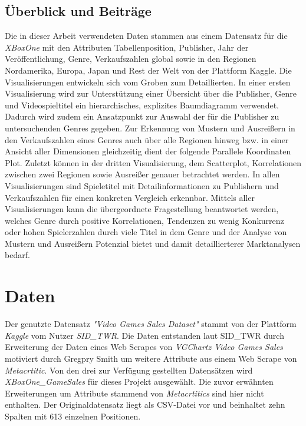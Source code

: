 \documentclass[usegeometry=true]{scrartcl}
\begin{document}
\subsection{Überblick und Beiträge}
Die in dieser Arbeit verwendeten Daten stammen aus einem Datensatz für die \textit{XBoxOne} mit den Attributen Tabellenposition, Publisher, Jahr der Veröffentlichung, Genre, Verkaufszahlen global sowie in den Regionen Nordamerika, Europa, Japan und Rest der Welt von der Plattform Kaggle.\cite{SID_TWR.} 
Die Visualisierungen entwickeln sich vom Groben zum Detaillierten.
In einer ersten Visualisierung wird zur Unterstützung einer Übersicht über die Publisher, Genre und Videospieltitel ein hierarchisches, explizites Baumdiagramm verwendet. 
Dadurch wird zudem ein Ansatzpunkt zur Auswahl der für die Publisher zu untersuchenden Genres gegeben.
Zur Erkennung von Mustern und Ausreißern in den Verkaufszahlen eines Genres auch über alle Regionen hinweg bzw. in einer Ansicht aller Dimensionen gleichzeitig dient der folgende Parallele Koordinaten Plot.
Zuletzt können in der dritten Visualisierung, dem Scatterplot, Korrelationen zwischen zwei Regionen sowie Ausreißer genauer betrachtet werden.
In allen Visualisierungen sind Spieletitel mit Detailinformationen zu Publishern und Verkaufszahlen für einen konkreten Vergleich erkennbar.
Mittels aller Visualisierungen kann die übergeordnete Fragestellung beantwortet werden, welches Genre durch positive Korrelationen, Tendenzen zu wenig Konkurrenz oder hohen Spielerzahlen durch viele Titel in dem Genre und der Analyse von Mustern und Ausreißern Potenzial bietet und damit detaillierterer Marktanalysen bedarf.

\section{Daten}
Der genutzte Datensatz \textit{"Video Games Sales Dataset"} stammt von der Plattform \textit{Kaggle} vom Nutzer \textit{SID\_TWR}.\cite{SID_TWR.} 
Die Daten entstanden laut SID\_TWR durch Erweiterung der Daten eines Web Scrapes von \textit{VGChartz Video Games Sales} motiviert durch Gregpry Smith um weitere Attribute aus einem Web Scrape von \textit{Metacrtitic}.  
Von den drei zur Verfügung gestellten Datensätzen wird \textit{XBoxOne\_GameSales} für dieses Projekt ausgewählt. 
Die zuvor erwähnten Erweiterungen um Attribute stammend von \textit{Metacrtitics} sind hier nicht enthalten. 
Der Originaldatensatz liegt als CSV-Datei vor und beinhaltet zehn Spalten mit 613 einzelnen Positionen. 
\end{document}
